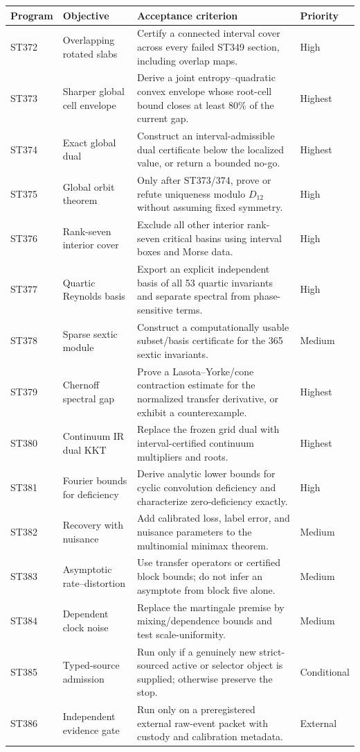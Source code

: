 \documentclass[11pt,a4paper]{article}
\begin{document}
\begin{longtable}{>{\raggedright\arraybackslash}p{}>{\raggedright\arraybackslash}p{}>{\raggedright\arraybackslash}p{}>{\raggedright\arraybackslash}p{}}
\toprule Program&Objective&Acceptance criterion&Priority\\\midrule\endhead
ST372&Overlapping rotated slabs&Certify a connected interval cover across every failed ST349 section, including overlap maps.&High\\
ST373&Sharper global cell envelope&Derive a joint entropy--quadratic convex envelope whose root-cell bound closes at least 80\% of the current gap.&Highest\\
ST374&Exact global dual&Construct an interval-admissible dual certificate below the localized value, or return a bounded no-go.&Highest\\
ST375&Global orbit theorem&Only after ST373/374, prove or refute uniqueness modulo $D_{12}$ without assuming fixed symmetry.&High\\
ST376&Rank-seven interior cover&Exclude all other interior rank-seven critical basins using interval boxes and Morse data.&High\\
ST377&Quartic Reynolds basis&Export an explicit independent basis of all 53 quartic invariants and separate spectral from phase-sensitive terms.&High\\
ST378&Sparse sextic module&Construct a computationally usable subset/basis certificate for the 365 sextic invariants.&Medium\\
ST379&Chernoff spectral gap&Prove a Lasota--Yorke/cone contraction estimate for the normalized transfer derivative, or exhibit a counterexample.&Highest\\
ST380&Continuum IR dual KKT&Replace the frozen grid dual with interval-certified continuum multipliers and roots.&Highest\\
ST381&Fourier bounds for deficiency&Derive analytic lower bounds for cyclic convolution deficiency and characterize zero-deficiency exactly.&High\\
ST382&Recovery with nuisance&Add calibrated loss, label error, and nuisance parameters to the multinomial minimax theorem.&Medium\\
ST383&Asymptotic rate--distortion&Use transfer operators or certified block bounds; do not infer an asymptote from block five alone.&Medium\\
ST384&Dependent clock noise&Replace the martingale premise by mixing/dependence bounds and test scale-uniformity.&Medium\\
ST385&Typed-source admission&Run only if a genuinely new strict-sourced active or selector object is supplied; otherwise preserve the stop.&Conditional\\
ST386&Independent evidence gate&Run only on a preregistered external raw-event packet with custody and calibration metadata.&External\\
\bottomrule
\end{longtable}
\end{document}
